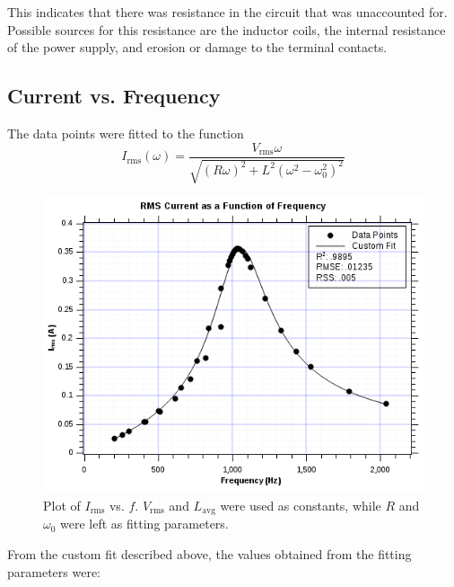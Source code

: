 \documentclass[twocolumn,english]{IEEEtran}
\theoremstyle{plain}
\theoremstyle{plain}
\begin{document}
This indicates that there was resistance in the circuit that was unaccounted for. Possible sources for this resistance are the inductor coils, the internal resistance of the power supply, and erosion or damage to the terminal contacts.
\hrulefill

\subsection{Current vs. Frequency}


The data points were fitted to the function
\begin{equation}
	I_{\text{rms}}(\omega)
	= \frac
	{V_{\text{rms}}\omega}
	{\sqrt{(R\omega)^2 +L^2(\omega^2-\omega_0^2)^2}}
\end{equation}

\begin{figure}[H]
	\begin{centering}
	\begin{center}
	\includegraphics[width=\linewidth]{./Part3.png}
	\caption{Plot of $I_{\text{rms}}$ vs. $f$. $V_{\text{rms}}$ and $L_{\text{avg}}$ were used as constants, while $R$ and $\omega_0$ were left as fitting parameters.}
	\label{fig:IvsFreq}
	\end{center}
	\par\end{centering}
\end{figure}

From the custom fit described above, the values obtained from the fitting parameters were:
\end{document}
